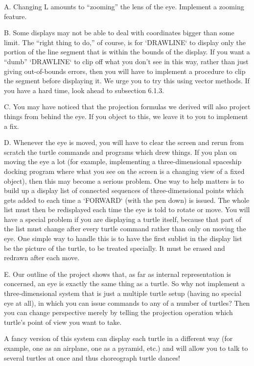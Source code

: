 \documentclass{book}
\begin{document}
A. Changing L amounts to ``zooming'' the lens of the eye. Implement a
zooming feature.

B. Some displays may not be able to deal with coordinates bigger than
some limit. The ``right thing to do,'' of course, is for \textsc{`DRAWLINE`} to display
only the portion of the line segment that is within the bounds of the
display. If you want a ``dumb'' \textsc{`DRAWLINE`} to clip off what you don't see
in this way, rather than just giving out-of-bounds errors, then you will
have to implement a procedure to clip the segment before displaying it.
We urge you to try this using vector methods. If you have a hard time,
look ahead to subsection 6.1.3.

C. You may have noticed that the projection formulas we derived will 
also project things from behind the eye. If you object to this, we leave
it to you to implement a fix.

D. Whenever the eye is moved, you will have to clear the screen and rerun
from scratch the turtle commands and programs which drew things. If
you plan on moving the eye a lot (for example, implementing a three-dimensional spaceship docking program where what you see on the
screen is a changing view of a fixed object), then this may become a
serious problem. One way to help matters is to build up a display list  
of connected sequences of three-dimensional points which gets added to
each time a \textsc{`FORWARD`} (with the pen down) is issued. The whole list must
then be redisplayed each time the eye is told to rotate or move. You
will have a special problem if you are displaying a turtle itself, because
that part of the list must change after every turtle command rather than
only on moving the eye. One simple way to handle this is to have the
first sublist in the display list be the picture of the turtle, to be treated
specially. It must be erased and redrawn after each move.


E. Our outline of the project shows that, as far as internal representation
is concerned, an eye is exactly the same thing as a turtle. So why not
implement a three-dimensional system that is just a multiple turtle setup
(having no special eye at all), in which you can issue commands to any of
a number of turtles? Then you can change perspective merely by telling
the projection operation which turtle's point of view you want to take.

A fancy version of this system can display each turtle in a different way
(for example, one as an airplane, one as a pyramid, etc.) and will allow
you to talk to several turtles at once and thus choreograph turtle dances!
\end{document}
